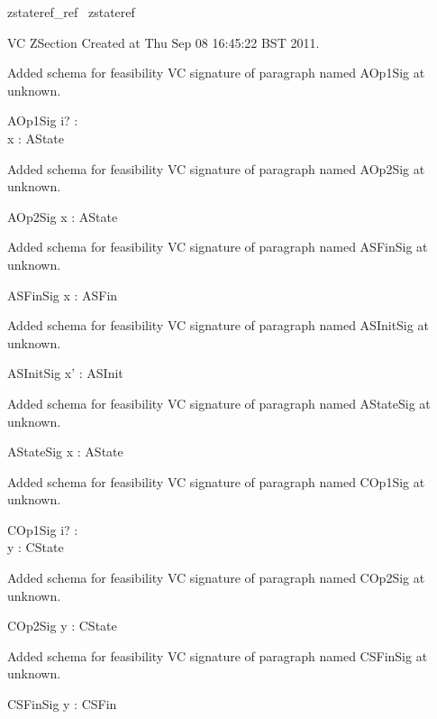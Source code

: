 \documentclass{article}
\begin{document}

\begin{zsection}	 \SECTION zstateref\_ref \parents~zstateref
\end{zsection}

VC ZSection Created at Thu Sep 08 16:45:22 BST 2011.


Added schema for feasibility VC signature of paragraph named AOp1Sig at unknown.
\begin{schema}{AOp1Sig}
i? : \nat \\
 x : \power \nat 
\where
 AState
\end{schema}


Added schema for feasibility VC signature of paragraph named AOp2Sig at unknown.
\begin{schema}{AOp2Sig}
x : \power \nat 
\where
 AState
\end{schema}


Added schema for feasibility VC signature of paragraph named ASFinSig at unknown.
\begin{schema}{ASFinSig}
x : \power \nat 
\where
 ASFin
\end{schema}


Added schema for feasibility VC signature of paragraph named ASInitSig at unknown.
\begin{schema}{ASInitSig}
x' : \power \nat 
\where
 ASInit
\end{schema}


Added schema for feasibility VC signature of paragraph named AStateSig at unknown.
\begin{schema}{AStateSig}
x : \power \nat 
\where
 AState
\end{schema}


Added schema for feasibility VC signature of paragraph named COp1Sig at unknown.
\begin{schema}{COp1Sig}
i? : \nat \\
 y : \seq \nat 
\where
 CState
\end{schema}


Added schema for feasibility VC signature of paragraph named COp2Sig at unknown.
\begin{schema}{COp2Sig}
y : \seq \nat 
\where
 CState
\end{schema}


Added schema for feasibility VC signature of paragraph named CSFinSig at unknown.
\begin{schema}{CSFinSig}
y : \seq \nat 
\where
 CSFin
\end{schema}
\end{document}
